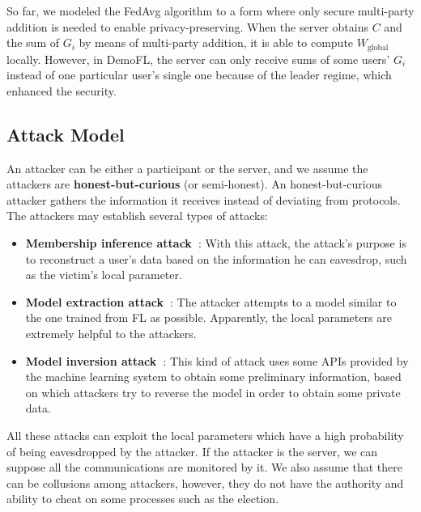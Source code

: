 So far, we modeled the FedAvg algorithm to a form where only secure multi-party addition is needed to enable privacy-preserving. When the server obtains $C$ and the sum of $G_i$ by means of multi-party addition, it is able to compute $W_\textrm{global}$ locally. However, in DemoFL, the server can only receive sums of some users' $G_i$ instead of one particular user's single one because of the leader regime, which enhanced the security.

\subsection{Attack Model}
An attacker can be either a participant or the server, and we assume the attackers are \textbf{honest-but-curious} (or semi-honest). An honest-but-curious attacker gathers the information it receives instead of deviating from protocols. The attackers may establish several types of attacks:

\begin{itemize}
    \item \textbf{Membership inference attack~\cite{Nasr19}}: With this attack, the attack's purpose is to reconstruct a user's data based on the information he can eavesdrop, such as the victim's local parameter.

    \item \textbf{Model extraction attack~\cite{Tramer16}}: The attacker attempts to a model similar to the one trained from FL as possible. Apparently, the local parameters are extremely helpful to the attackers.

    \item \textbf{Model inversion attack~\cite{Fredrikson15}}: This kind of attack uses some APIs provided by the machine learning system to obtain some preliminary information, based on which attackers try to reverse the model in order to obtain some private data.

\end{itemize}

All these attacks can exploit the local parameters which have a high probability of being eavesdropped by the attacker. If the attacker is the server, we can suppose all the communications are monitored by it. We also assume that there can be collusions among attackers, however, they do not have the authority and ability to cheat on some processes such as the election.


